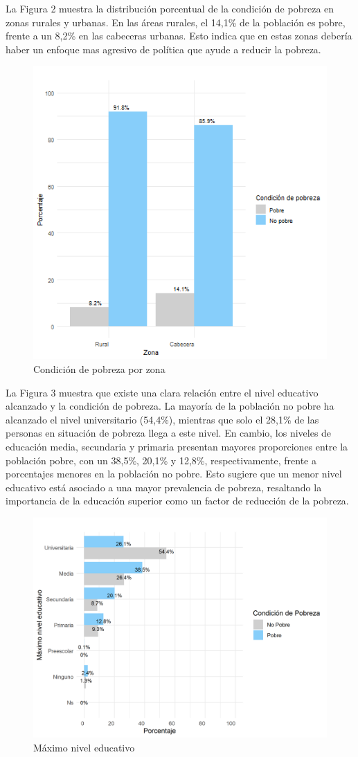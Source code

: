 \documentclass[a4paper]{article}
\theoremstyle{remark}
\theoremstyle{definition}
\begin{document}
La Figura 2 muestra la distribución porcentual de la condición de pobreza en zonas rurales y urbanas. En las áreas rurales, el 14,1\% de la población es pobre, frente a un 8,2\% en las cabeceras urbanas. Esto indica que en estas zonas debería haber un enfoque mas agresivo de política que ayude a reducir la pobreza.\\

    \begin{figure}[H]
        \centering
            \caption{Condición de pobreza por zona}
        \includegraphics[width=0.5\linewidth]{Graficas/Clase.png}
    \end{figure}

  La Figura 3 muestra que existe una clara relación entre el nivel educativo alcanzado y la condición de pobreza. La mayoría de la población no pobre ha alcanzado el nivel universitario (54,4\%), mientras que solo el 28,1\% de las personas en situación de pobreza llega a este nivel. En cambio, los niveles de educación media, secundaria y primaria presentan mayores proporciones entre la población pobre, con un 38,5\%, 20,1\% y 12,8\%, respectivamente, frente a porcentajes menores en la población no pobre. Esto sugiere que un menor nivel educativo está asociado a una mayor prevalencia de pobreza, resaltando la importancia de la educación superior como un factor de reducción de la pobreza.
  
    \begin{figure}[H]
        \centering
            \caption{Máximo nivel educativo}
        \includegraphics[width=0.6\linewidth]{Graficas/Educacion.png}
    \end{figure}
\end{document}
